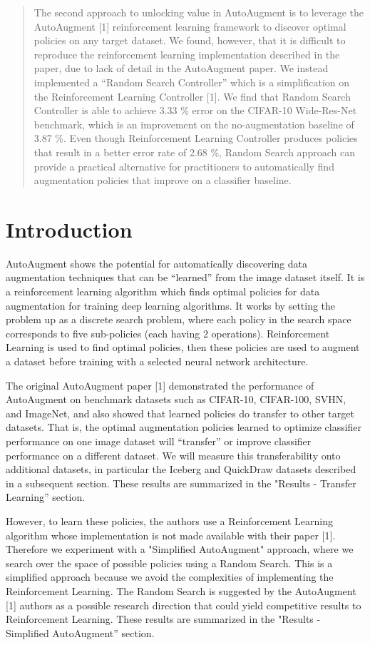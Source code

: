 \documentclass[10pt,twocolumn,letterpaper]{article}
\begin{document}
\begin{abstract}
The second approach to unlocking value in AutoAugment is to leverage the AutoAugment [1] reinforcement learning framework to discover optimal policies on any target dataset.  We found, however, that it is difficult to reproduce the reinforcement learning implementation described in the paper, due to lack of detail in the AutoAugment paper.  We instead implemented a “Random Search Controller” which is a simplification on the Reinforcement Learning Controller [1].  We find that Random Search Controller is able to achieve 3.33 \% error on the CIFAR-10 Wide-Res-Net benchmark, which is an improvement on the no-augmentation baseline of 3.87 \%. Even though Reinforcement Learning Controller produces policies that result in a better error rate of 2.68 \%, Random Search approach can provide a practical alternative for practitioners to automatically find augmentation policies that improve on a classifier baseline.
\end{abstract}

\section{Introduction}

AutoAugment shows the potential for automatically discovering data augmentation techniques that can be “learned” from the image dataset itself. It is a reinforcement learning algorithm which finds optimal policies for data augmentation for training deep learning algorithms. It works by setting the problem up as a discrete search problem, where each policy in the search space corresponds to five sub-policies (each having 2 operations). Reinforcement Learning is used to find optimal policies, then these policies are used to augment a dataset before training with a selected neural network architecture.

The original AutoAugment paper [1] demonstrated the performance of AutoAugment on benchmark datasets such as CIFAR-10, CIFAR-100, SVHN, and ImageNet, and also showed that learned policies do transfer to other target datasets.  That is, the optimal augmentation policies learned to optimize classifier performance on one image dataset will “transfer” or improve classifier performance on a different dataset.   We will measure this transferability onto additional datasets, in particular the Iceberg and QuickDraw datasets described in a subsequent section.  These results are summarized in the "Results - Transfer Learning” section.

However, to learn these policies, the authors use a Reinforcement Learning algorithm whose implementation is not made available with their paper [1].  Therefore we experiment with a "Simplified AutoAugment" approach, where we search over the space of possible policies using a Random Search.  This is a simplified approach because we avoid the complexities of implementing the Reinforcement Learning. The Random Search is suggested by the AutoAugment [1] authors as a possible research direction that could yield competitive results to Reinforcement Learning. These results are summarized in the "Results - Simplified AutoAugment” section.
\end{document}
